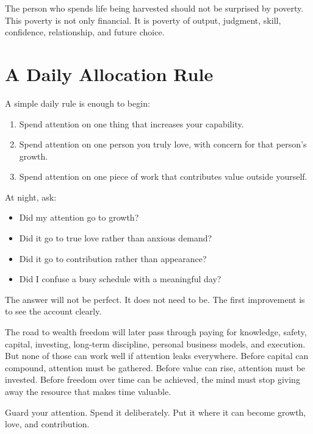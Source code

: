 The person who spends life being harvested should not be surprised by poverty. This poverty is not only financial. It is poverty of output, judgment, skill, confidence, relationship, and future choice.

\section*{A Daily Allocation Rule}

A simple daily rule is enough to begin:

\begin{enumerate}
\item Spend attention on one thing that increases your capability.
\item Spend attention on one person you truly love, with concern for that person's growth.
\item Spend attention on one piece of work that contributes value outside yourself.
\end{enumerate}

At night, ask:

\begin{itemize}
\item Did my attention go to growth?
\item Did it go to true love rather than anxious demand?
\item Did it go to contribution rather than appearance?
\item Did I confuse a busy schedule with a meaningful day?
\end{itemize}

The answer will not be perfect. It does not need to be. The first improvement is to see the account clearly.

The road to wealth freedom will later pass through paying for knowledge, safety, capital, investing, long-term discipline, personal business models, and execution. But none of those can work well if attention leaks everywhere. Before capital can compound, attention must be gathered. Before value can rise, attention must be invested. Before freedom over time can be achieved, the mind must stop giving away the resource that makes time valuable.

Guard your attention. Spend it deliberately. Put it where it can become growth, love, and contribution.
